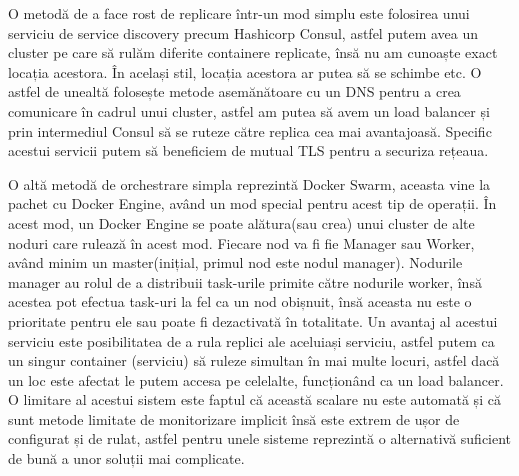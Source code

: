 O metodă de a face rost de replicare într-un mod simplu este folosirea unui serviciu
de service discovery precum Hashicorp Consul, astfel putem avea un cluster pe care
să rulăm diferite containere replicate, însă nu am cunoaște exact locația acestora. În același 
stil, locația acestora ar putea să se schimbe etc. O astfel de unealtă folosește metode 
asemănătoare cu un DNS pentru a crea comunicare în cadrul unui cluster, astfel 
am putea să avem un load balancer și prin intermediul Consul să se ruteze 
către replica cea mai avantajoasă. Specific acestui servicii putem să beneficiem de 
mutual TLS pentru a securiza rețeaua.

O altă metodă de orchestrare simpla reprezintă Docker Swarm, aceasta vine la pachet 
cu Docker Engine, având un mod special pentru acest tip de operații. În acest mod, 
un Docker Engine se poate alătura(sau crea) unui cluster de alte noduri care rulează
în acest mod. Fiecare nod va fi fie Manager sau Worker, având minim un master(inițial,
primul nod este nodul manager). Nodurile manager au rolul de a distribuii task-urile primite
către nodurile worker, însă acestea pot efectua task-uri la fel ca un nod obișnuit,
însă aceasta nu este o prioritate pentru ele sau poate fi dezactivată în totalitate.
Un avantaj al acestui serviciu este posibilitatea de a rula replici ale aceluiași serviciu,
astfel putem ca un singur container (serviciu) să ruleze simultan în mai multe locuri, 
astfel dacă un loc este afectat le putem accesa pe celelalte, funcționând ca un load balancer.
O limitare al acestui sistem este faptul că această scalare nu este automată și că
sunt metode limitate de monitorizare implicit însă este extrem de ușor de configurat și de rulat,
astfel pentru unele sisteme reprezintă o alternativă suficient de bună a unor soluții mai complicate.
